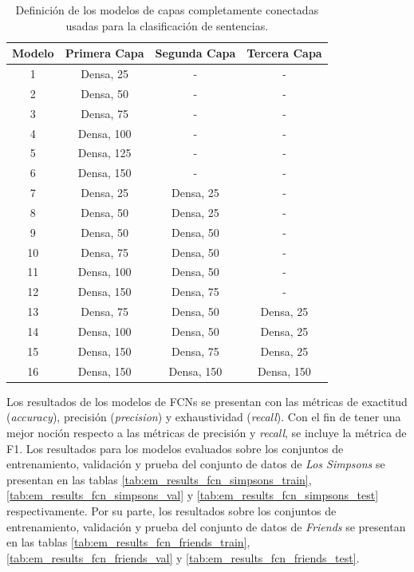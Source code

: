 \begin{table}[H]
    \centering
    \begin{tabular}{|c|c|c|c|}
        \hline 
        \textbf{Modelo} & \textbf{Primera Capa} & \textbf{Segunda Capa} & \textbf{Tercera Capa} \\ \hline
        1 & Densa, 25 & - & - \\ \hline
        2 & Densa, 50 & - & - \\ \hline
        3 & Densa, 75 & - & - \\ \hline
        4 & Densa, 100 & - & - \\ \hline
        5 & Densa, 125 & - & - \\ \hline
        6 & Densa, 150 & - & - \\ \hline
        7 & Densa, 25 & Densa, 25 & - \\ \hline
        8 & Densa, 50 & Densa, 25 & - \\ \hline
        9 & Densa, 50 & Densa, 50 & - \\ \hline
        10 & Densa, 75 & Densa, 50 & - \\ \hline
        11 & Densa, 100 & Densa, 50 & - \\ \hline
        12 & Densa, 150 & Densa, 75 & - \\ \hline
        13 & Densa, 75 & Densa, 50 & Densa, 25 \\ \hline
        14 & Densa, 100 & Densa, 50 & Densa, 25 \\ \hline
        15 & Densa, 150 & Densa, 75 & Densa, 25 \\ \hline
        16 & Densa, 150 & Densa, 150 & Densa, 150 \\ \hline
    \end{tabular}
    \caption{Definición de los modelos de capas completamente conectadas usadas para la clasificación de sentencias.}
    \label{tab:em_fcn_definition}
\end{table}

Los resultados de los modelos de FCNs se presentan con las métricas de exactitud (\textit{accuracy}), precisión (\textit{precision}) y exhaustividad (\textit{recall}). Con el fin de tener una mejor noción respecto a las métricas de precisión y \textit{recall}, se incluye la métrica de F1. Los resultados para los modelos evaluados sobre los conjuntos de entrenamiento, validación y prueba del conjunto de datos de \textit{Los Simpsons} se presentan en las tablas \ref{tab:em_results_fcn_simpsons_train}, \ref{tab:em_results_fcn_simpsons_val} y \ref{tab:em_results_fcn_simpsons_test} respectivamente. Por su parte, los resultados sobre los conjuntos de entrenamiento, validación y prueba del conjunto de datos de \textit{Friends} se presentan en las tablas \ref{tab:em_results_fcn_friends_train}, \ref{tab:em_results_fcn_friends_val} y \ref{tab:em_results_fcn_friends_test}.

